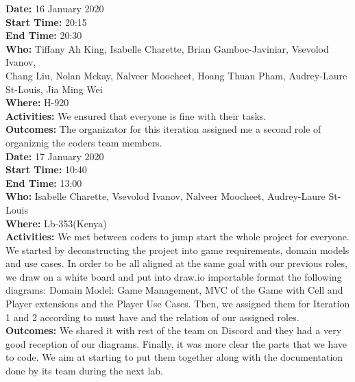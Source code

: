 \documentclass[12pt]{article}
\begin{document}
{\bf Date:} 16 January 2020\\
{\bf Start Time:} 20:15\\
{\bf End Time:} 20:30\\
{\bf Who:} Tiffany Ah King, Isabelle Charette, Brian Gamboc-Javiniar, Vsevolod Ivanov,\\
Chang Liu, Nolan Mckay, Nalveer Moocheet, Hoang Thuan Pham, Audrey-Laure St-Louis, Jia Ming Wei\\
{\bf Where:} H-920\\
{\bf Activities:} We ensured that everyone is fine with their tasks.\\
{\bf Outcomes:} The organizator for this iteration assigned me a second role of organiznig the coders team members.\\

{\bf Date:} 17 January 2020\\
{\bf Start Time:} 10:40\\
{\bf End Time:} 13:00\\
{\bf Who:} Isabelle Charette, Vsevolod Ivanov, Nalveer Moocheet, Audrey-Laure St-Louis\\
{\bf Where:} Lb-353(Kenya)\\
{\bf Activities:} We met between coders to jump start the whole project for everyone. We started by deconstructing the project into game requirements, domain models and use cases. In order to be all aligned at the same goal with our previous roles, we draw on a white board and put into draw.io importable format the following diagrams: Domain Model: Game Management, MVC of the Game with Cell and Player extensions and the Player Use Cases. Then, we assigned them for Iteration 1 and 2 according to must have and the relation of our assigned roles.\\
{\bf Outcomes:} We shared it with rest of the team on Discord and they had a very good reception of our diagrams. Finally, it was more clear the parts that we have to code. We aim at starting to put them together along with the documentation done by its team during the next lab.\\

\pagebreak
\end{document}
